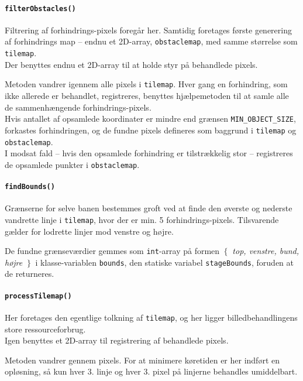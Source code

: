 \paragraph{\texttt{filterObstacles()}}
Filtrering af forhindrings-pixels foregår her. Samtidig foretages første generering af forhindrings map -- endnu et 2D-array, \texttt{obstaclemap}, med samme størrelse som \texttt{tilemap}.\\
Der benyttes endnu et 2D-array til at holde styr på behandlede pixels.

Metoden vandrer igennem alle pixels i \texttt{tilemap}. Hver gang en forhindring, som ikke allerede er behandlet, registreres, benyttes hjælpemetoden  til at samle alle de sammenhængende forhindrings-pixels.\\
Hvis antallet af opsamlede koordinater er mindre end grænsen \texttt{MIN\_OBJECT\_SIZE}, forkastes forhindringen, og de fundne pixels defineres som baggrund i \texttt{tilemap} og \texttt{obstaclemap}.\\
I modsat fald -- hvis den opsamlede forhindring er tilstrækkelig stor -- registreres de opsamlede punkter i \texttt{obstaclemap}.

\paragraph{\texttt{findBounds()}}
Grænserne for selve banen bestemmes groft ved at finde den øverste og nederste vandrette linje i \texttt{tilemap}, hvor der er min. 5 forhindrings-pixels. Tilsvarende gælder for lodrette linjer mod venstre og højre.

De fundne grænseværdier gemmes som \texttt{int}-array på formen \textit{$\left\{\right.$ top, venstre, bund, højre $\left.\right\}$} i klasse-variablen \texttt{bounds}, den statiske variabel \texttt{stageBounds}, foruden at de returneres.

\paragraph{\texttt{processTilemap()}}
Her foretages den egentlige tolkning af \texttt{tilemap}, og her ligger billedbehandlingens store ressourceforbrug.\\
Igen benyttes et 2D-array til registrering af behandlede pixels.

Metoden vandrer gennem pixels. For at minimere køretiden er her indført en opløsning, så kun hver 3. linje og hver 3. pixel på linjerne behandles umiddelbart.

